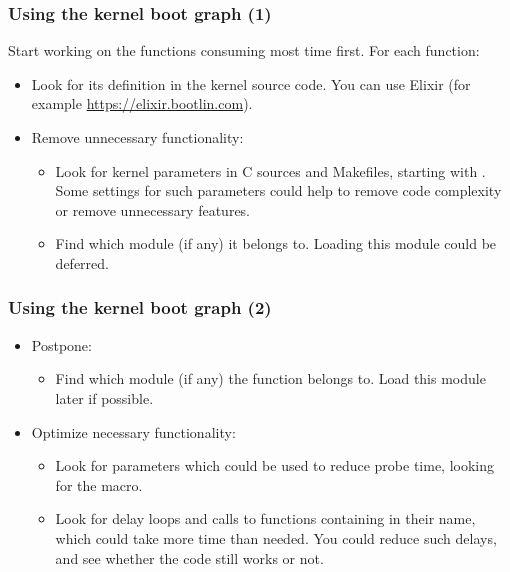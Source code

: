 \begin{frame}
\frametitle{Using the kernel boot graph (1)}
Start working on the functions consuming most time first. For each
function:
\begin{itemize}
\item Look for its definition in the kernel source code. You can use
      Elixir (for example \url{https://elixir.bootlin.com}).
\item Remove unnecessary functionality:
      \begin{itemize}
      \item Look for kernel parameters in C sources and Makefiles, starting
      with . Some settings for such parameters could help
      to remove code complexity or remove unnecessary features.
      \item Find which module (if any) it belongs to. Loading this module
            could be deferred.
      \end{itemize}
\end{itemize}
\end{frame}

\begin{frame}
\frametitle{Using the kernel boot graph (2)}
\begin{itemize}
\item Postpone:
      \begin{itemize}
      \item Find which module (if any) the function belongs to.
            Load this module later if possible.
      \end{itemize}
\item Optimize necessary functionality:
      \begin{itemize}
      \item Look for parameters which could be used to reduce probe time,
            looking for the  macro.
      \item Look for delay loops and calls to functions containing
             in their name, which could take more time than
            needed. You could reduce such delays, and see whether the
            code still works or not.
      \end{itemize}
\end{itemize}
\end{frame}

